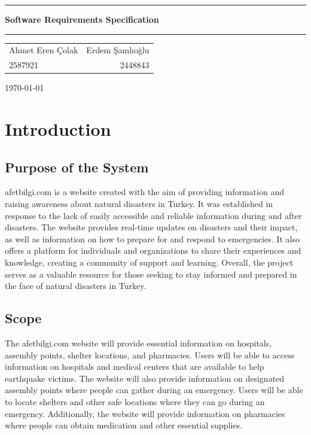 \documentclass[12pt]{report}
\begin{document}
\begin{titlepage}
    \vspace*{4cm}
    \rule{\textwidth}{2px}
    \vspace{0.2cm}
    
    \textbf{\huge{{Software Requirements Specification}}}\par \vspace{0.1cm}
    
    \rule{\textwidth}{2px}
    
    \vspace{1cm}
    
    \begin{tabularx}{\textwidth}{X r}
    \large{Ahmet Eren Çolak }   & \large{Erdem Şamlıoğlu} \\
    2587921 & 2448843
    \end{tabularx}
    
    \vspace{1.3cm}
    
    \vfill
    \today
    
    \end{titlepage}

\tableofcontents
\listoffigures
\listoftables

\chapter{Introduction}

\section{Purpose of the System}
afetbilgi.com is a website created with the aim of providing information and raising awareness 
about natural disasters in Turkey. It was established in response to the lack of easily accessible 
and reliable information during and after disasters. The website provides real-time updates on 
disasters and their impact, as well as information on how to prepare for and respond to emergencies. 
It also offers a platform for individuals and organizations to share their experiences and knowledge, 
creating a community of support and learning. Overall, the project serves as a valuable 
resource for those seeking to stay informed and prepared in the face of natural disasters in Turkey.

\section{Scope}
The afetbilgi.com website will provide essential information on hospitals, assembly points, shelter 
locations, and pharmacies. Users will be able to access information on hospitals and medical centers 
that are available to help earthquake victims. The website will also provide information on designated 
assembly points where people can gather during an emergency. Users will be able to locate shelters 
and other safe locations where they can go during an emergency. Additionally, the website will provide 
information on pharmacies where people can obtain medication and other essential supplies.
\newline
\end{document}
